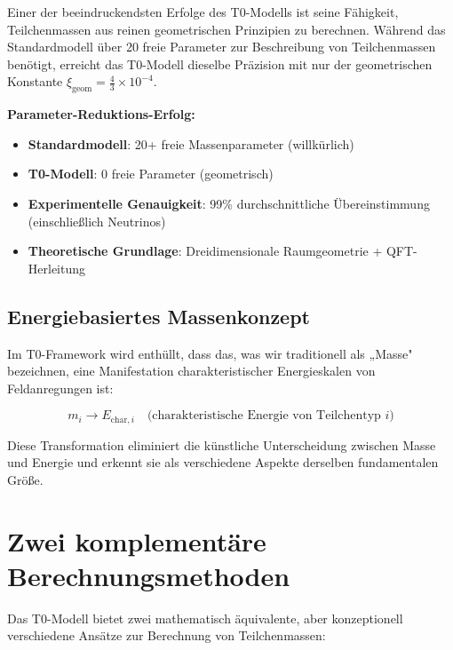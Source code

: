 \documentclass[12pt,a4paper]{article}
\newcommand{\xigeom}{\xi_{\text{geom}}}
\begin{document}
	Einer der beeindruckendsten Erfolge des T0-Modells ist seine Fähigkeit, Teilchenmassen aus reinen geometrischen Prinzipien zu berechnen. Während das Standardmodell über 20 freie Parameter zur Beschreibung von Teilchenmassen benötigt, erreicht das T0-Modell dieselbe Präzision mit nur der geometrischen Konstante $\xigeom = \frac{4}{3} \times 10^{-4}$.
	
	\begin{tcolorbox}[colback=green!5!white,colframe=green!75!black,title=Massen-Revolution]
		\textbf{Parameter-Reduktions-Erfolg:}
		\begin{itemize}
			\item \textbf{Standardmodell}: 20+ freie Massenparameter (willkürlich)
			\item \textbf{T0-Modell}: 0 freie Parameter (geometrisch)
			\item \textbf{Experimentelle Genauigkeit}: 99\% durchschnittliche Übereinstimmung (einschließlich Neutrinos)
			\item \textbf{Theoretische Grundlage}: Dreidimensionale Raumgeometrie + QFT-Herleitung
		\end{itemize}
	\end{tcolorbox}
	
	\subsection{Energiebasiertes Massenkonzept}
	\label{subsec:energy_based_mass}
	
	Im T0-Framework wird enthüllt, dass das, was wir traditionell als „Masse" bezeichnen, eine Manifestation charakteristischer Energieskalen von Feldanregungen ist:
	
	\begin{equation}
		\boxed{m_i \rightarrow E_{\text{char},i} \quad \text{(charakteristische Energie von Teilchentyp } i\text{)}}
		\label{eq:mass_to_energy}
	\end{equation}
	
	Diese Transformation eliminiert die künstliche Unterscheidung zwischen Masse und Energie und erkennt sie als verschiedene Aspekte derselben fundamentalen Größe.
	
	\section{Zwei komplementäre Berechnungsmethoden}
	\label{sec:two_calculation_methods}
	
	Das T0-Modell bietet zwei mathematisch äquivalente, aber konzeptionell verschiedene Ansätze zur Berechnung von Teilchenmassen:
	
\end{document}
